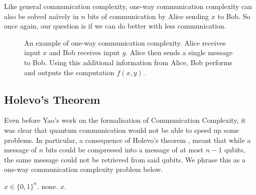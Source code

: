 \documentclass[a4paper]{article}
\begin{document}
        Like general communication complexity, one-way communication complexity can also be solved na\"{i}vely in $n$ bits of communication by Alice sending $x$ to Bob. So once again, our question is if we can do better with less communication.

        \begin{figure}
            \centering
            \caption{An example of one-way communication complexity. Alice receives input $x$ and Bob receives input $y$. Alice then sends a single message to Bob. Using this additional information from Alice, Bob performs and outputs the computation $f(x, y)$.}
            \label{fig:ow-cc}
        \end{figure}

        \subsection{Holevo's Theorem}

        Even before Yao's work on the formalisation of Communication Complexity, it was clear that quantum communication would not be able to speed up some problems. In particular, a consequence of Holevo's theorem \cite{Hol73}, meant that while a message of $n$ bits could be compressed into a message of at most $n-1$ qubits, the same message could not be retrieved from said qubits. We phrase this as a one-way communication complexity problem below.

        \begin{codebox}
            \zi {} $x \in \{0, 1\}^n$.
            \zi {} none.
            \zi {} $x$.
        \end{codebox}
\end{document}
